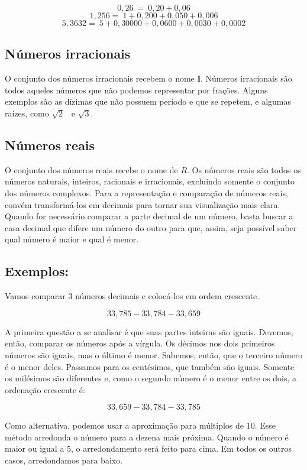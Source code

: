 $$0,26\  = \ 0,20 + 0,06$$
$$1,256 = \ 1 + 0,200 + 0,050 + 0,006$$
$$5,3632 = \ 5 + 0,30000 + 0,0600 + 0,0030 + 0,0002$$

\subsection{Números irracionais}

O conjunto dos números irracionais recebem o nome 𝕀. Números irracionais
são todos aqueles números que não podemos representar por frações.
Alguns exemplos são as dízimas que não possuem período e que se repetem,
e algumas raízes, como $\sqrt{2}$ \ e $\sqrt{3}$.

\subsection{Números reais}

O conjunto dos números reais recebe o nome de $R$. Os números reais são
todos os números naturais, inteiros, racionais e irracionais, excluindo
somente o conjunto dos números complexos. Para a representação e
comparação de números reais, convém transformá-los em decimais para
tornar sua visualização mais clara. Quando for necessário comparar a
parte decimal de um número, basta buscar a casa decimal que difere um
número do outro para que, assim, seja possível saber qual número é maior
e qual é menor.

\subsection{Exemplos:}

Vamos comparar 3 números decimais e colocá-los em ordem crescente.

$$33,785  - 33,784  - 33,659$$

A primeira questão a se analisar é que suas partes inteiras são iguais.
Devemos, então, comparar os números após a vírgula. Os décimos nos dois
primeiros números são iguais, mas o último é menor. Sabemos, então, que
o terceiro número é o menor deles. Passamos para os centésimos, que
também são iguais. Somente os milésimos são diferentes e, como o segundo
número é o menor entre os dois, a ordenação crescente é:

$$33,659  - 33,784  - 33,785$$

Como alternativa, podemos usar a aproximação para múltiplos de $10$. Esse
método arredonda o número para a dezena mais próxima. Quando o número é
maior ou igual a $5$, o arredondamento será feito para cima. Em todos os
outros casos, arredondamos para baixo.


